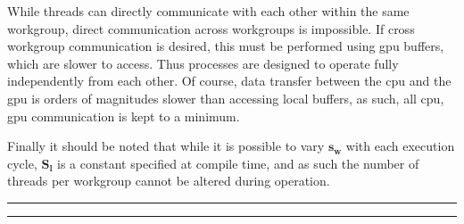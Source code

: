     While threads can directly communicate with each other within the same workgroup, direct communication across workgroups is
    impossible. If cross workgroup communication is desired, this must be performed using \ac{gpu} buffers, which are slower to access. Thus processes are
    designed to operate fully independently from each other. Of course, data transfer between the \ac{cpu} and the \ac{gpu} is orders of magnitudes
    slower than accessing local buffers, as such, all \ac{cpu}, \ac{gpu} communication is kept to a minimum.
    
    Finally it should be noted that while it is possible to vary \(\bm{s_w}\) with each execution cycle, \(\bm{S_l}\) is a constant specified at compile time,
    and as such the number of threads per workgroup cannot be altered during operation.

\bigskip
\bigskip
\hrule
\smallbreak
\hrule